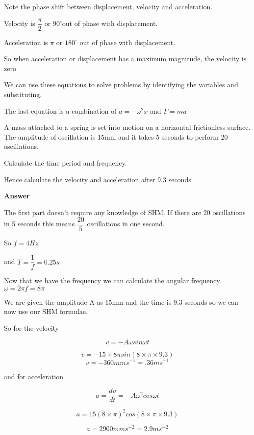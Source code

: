 \documentclass[main.tex]{subfiles}
\begin{document}
Note the phase shift between displacement, velocity and acceleration.

Velocity is $\dfrac{\pi}{2}$ or $90^\circ$out of phase with displacement.

Acceleration is $\pi$ or $180^\circ$ out of phase with displacement.

So when acceleration or displacement has a maximum magnitude, the velocity is zero



We can use these equations to solve problems by identifying the variables and substituting.

The last equation is a combination of $a = -\omega^2 x$ and $F = ma$

\begin{example}


A mass attached to a spring is set into motion on a horizontal frictionless surface. The amplitude of oscillation is 15mm and it takes 5 seconds to perform 20 oscillations.

Calculate the time period and frequency.

Hence calculate the velocity and acceleration after 9.3 seconds.

	\vspace{1cm}
    
\textbf{Answer}

The first part doesn't require any knowledge of SHM. If there are 20 oscillations in 5 seconds this means $\dfrac{20}{5}$ oscillations in one second.

So $f=4Hz$

and $T = \dfrac{1}{f} = 0.25s$

Now that we have the frequency we can calculate the angular frequency $\omega = 2 \pi f = 8 \pi$

We are given the amplitude A as 15mm and the time is 9.3 seconds so we can now use our SHM formulae.

So for the velocity

\[
v=-A \omega sin \omega t 
\]

\[
v = -15 \times 8 \pi sin (8 \times \pi \times 9.3)
\]
\[
v = -360 mms^{-1} = .36ms^{-1}
\]

and for acceleration

\[
a = \dfrac{dv}{dt}= -A \omega^2 cos \omega t
\]

\[
a = 15 (8 \times \pi)^2 cos (8 \times \pi \times 9.3)
\]

\[
a = 2900 mms^{-2} = 2.9ms^{-2}
\]


\end{example}
\end{document}
